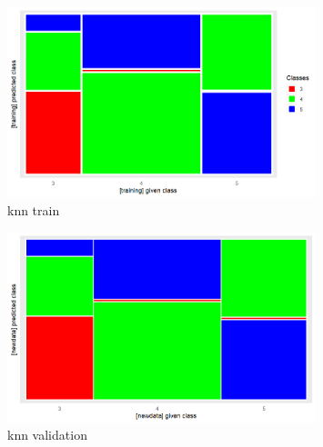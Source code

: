 \documentclass{article}
\begin{document}
\begin{figure}[h!]
        \centering
        \includegraphics[width=0.8\textwidth]{../plots/mos_knn_train.png}
        \caption{knn train}
        \label{fig:knntrain}
\end{figure}

\begin{figure}[h!]
        \centering
        \includegraphics[width=0.8\textwidth]{../plots/mos_knn_val.png}
        \caption{knn validation}
        \label{fig:knnval}
\end{figure}
\end{document}
